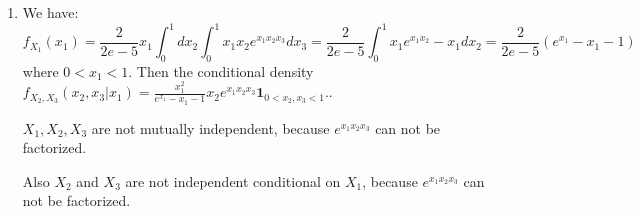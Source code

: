 \documentclass[12pt]{article}
\begin{document}
\begin{enumerate}
    \item
    We have:
    $$f_{X_1}(x_1) = \frac{2}{2e-5} x_1 \int_0^1 dx_2\int_0^1 x_1 x_2 e^{x_1 x_2 x_3}dx_3 = \frac{2}{2e-5} \int_0^1 x_1 e^{x_1 x_2} - x_1 dx_2 = \frac{2}{2e-5} (e^{x_1} - x_1 -1)$$ 
    where $0< x_1 <1$.
    Then the conditional density $f_{X_2,X_3}(x_2,x_3 | x_1) = \frac{x_1^2}{e^{x_1}-x_1-1} x_2 e^{x_1 x_2 x_3} \bm{1}_{0<x_2,x_3<1}$..

    $X_1,X_2,X_3$ are not mutually independent, because $e^{x_1 x_2 x_3}$ can not be factorized.

    Also $X_2$ and $X_3$ are not independent conditional on $X_1$, because $e^{x_1 x_2 x_3}$ can not be factorized.

\end{enumerate}
\end{document}
